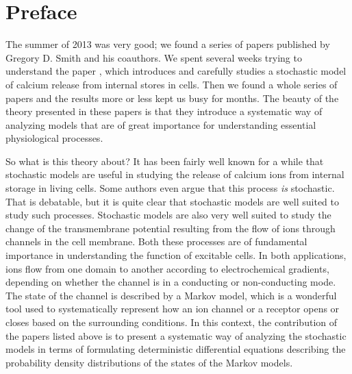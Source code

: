 

\chapter*{Preface}

The summer of 2013 was very good; we found a series of papers published by Gregory D. Smith and his coauthors. We spent several weeks trying to understand the paper \cite{Huertas2007}, which introduces and carefully studies a stochastic model of calcium release from internal stores in cells. Then we found a whole series of papers \cite{Mazzag2005,Williams2007,Williams2008,Huertas2010} and the results more or less kept us busy for months. The beauty of the theory presented in these papers is that they introduce a systematic way of analyzing models that are of great importance for understanding essential physiological processes.  

\bigskip

So what is this theory about? It has been fairly well known for a while that stochastic models are useful in studying the release of calcium ions from internal storage in living cells. Some authors even argue that this process {\it is} stochastic. That is debatable, but it is quite clear that stochastic models are well suited to study such processes. Stochastic models are also very well suited to study the change of the transmembrane potential resulting from the flow of ions through channels in the cell membrane. Both these processes are of fundamental importance in understanding the function of excitable cells. In both applications, ions flow from one domain to another according to electrochemical gradients, depending on whether the channel is in a conducting or non-conducting mode. The state of the channel is described by a Markov model, which is a wonderful tool used to systematically represent how an ion channel or a receptor opens or closes based on the surrounding conditions. In this context, the contribution of the papers listed above is to present a systematic way of analyzing the stochastic models in terms of formulating deterministic differential equations describing the probability density distributions of the states of the Markov models.
\bigskip

